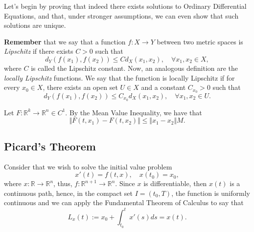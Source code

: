 Let's begin by proving that indeed there exists solutions to Ordinary
Differential Equations, and that, under stronger assumptions, we
can even show that such solutions are unique.

\begin{shaded}
  \textbf{Remember} that we say that a function
  $f:X\to Y$ between two metric spaces is \textit{Lipschitz} if there exists
  $C > 0$ such that
  \begin{displaymath}
    d_Y (f(x_1), f(x_2)) \leq C d_X(x_1,x_2) ,\quad \forall x_1, x_2 \in X,
  \end{displaymath}
  where $C$ is called the Lipschitz constant. Now, an analogous definition
  are the \textit{locally Lipschitz} functions. We say that the function
  is locally Lipschitz if for every $x_0 \in X$, there exists an open set $U \in X$
  and a constant $C_{x_0}>0$ such that
  \begin{displaymath}
    d_Y (f(x_1), f(x_2)) \leq C_{x_0} d_X(x_1,x_2) ,\quad \forall x_1, x_2 \in U.
  \end{displaymath}

  Let $F:\mathbb R^k \to \mathbb R^n \in C^1$. By the Mean Value Inequality,
  we have that
  \begin{displaymath}
    \Vert F(t,x_1)   - F(t,x_2) \Vert \leq \Vert x_1 - x_2 \Vert M.
  \end{displaymath}
  

\end{shaded}

\subsection{Picard's Theorem}

Consider that we wish to solve the initial value problem
\begin{displaymath}
 x'(t)  = f(t,x), \quad x(t_0) = x_0,
\end{displaymath}
where $x: \mathbb R \to \mathbb R^n$, thus, $f:\mathbb R^{n+1} \to \mathbb R^n$.
Since $x$ is differentiable, then $x(t)$ is a continuous path, hence,
in the compact set $I = (t_0, T)$, the function is uniformly continuous and
we can apply the Fundamental Theorem of Calculus to say that
\begin{displaymath}
 L_x(t) := x_0 + \int^t_{t_0} x'(s) ds = x(t).
\end{displaymath}


